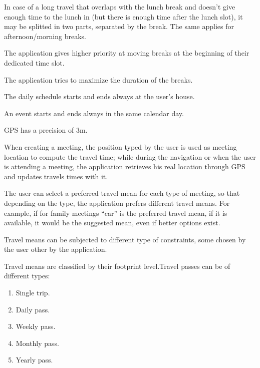 \begin{list}
\item
In case of a long travel that overlaps with the lunch break and doesn’t give enough time to the lunch in (but there is enough time after the lunch slot), it may be splitted in two parts, separated by the break. The same applies for afternoon/morning breaks.
\item
The application gives higher priority at moving breaks at the beginning of their dedicated time slot.
\item
The application tries to maximize the duration of the breaks.
\item
The daily schedule starts and ends always at the user’s house.
\item
An event starts and ends always in the same calendar day.
\item
GPS has a precision of 3m.
\item
When creating a meeting, the position typed by the user is used as meeting location to compute the travel time; while during the navigation or when the user is attending a meeting, the application retrieves his real location through GPS and updates travels times with it.
\item
The user can select a preferred travel mean for each type of meeting, so that depending on the type, the application prefers different travel means. For example, if for family meetings “car” is the preferred travel mean, if it is available, it would be the suggested mean, even if better options exist.
\item
Travel means can be subjected to different type of constraints, some chosen by the user other by the application.
\item
Travel means are classified by their footprint level.Travel passes can be of different types:
\begin{enumerate}
\item
Single trip.
\item
Daily pass.
\item
Weekly pass.
\item
Monthly pass.
\item
Yearly pass.
\end{enumerate}


\end{list}
